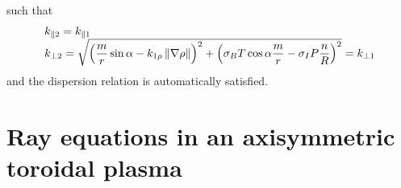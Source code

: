 \documentclass[a4paper,12pt]{article}%
\begin{document}
such that%
\begin{equation}%
\begin{array}
[c]{l}%
k_{\Vert2}=k_{\Vert1}\\
k_{\bot2}=\sqrt{\left(  \dfrac{m}{r}\sin\alpha-k_{1\rho}\left\Vert
\mathbf{\nabla}\rho\right\Vert \right)  ^{2}+\left(  \sigma_{B}T\cos
\alpha\dfrac{m}{r}-\sigma_{I}P\dfrac{n}{R}\right)  ^{2}}=k_{\bot1}%
\end{array}
\end{equation}
and the dispersion relation is automatically satisfied.

\section{\bigskip Ray equations in an axisymmetric toroidal plasma}
\end{document}
